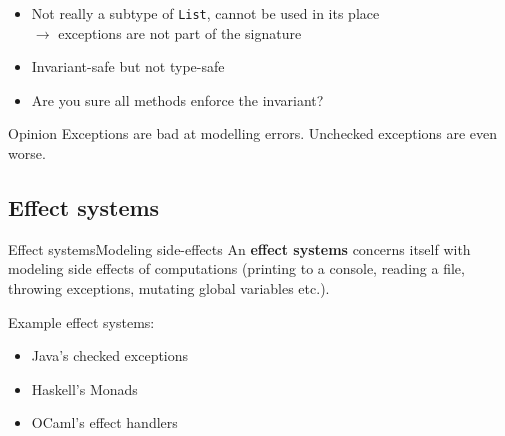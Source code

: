 \documentclass[compress,12pt,xcolor={dvipsnames}]{beamer}
\begin{document}
\begin{frame}
    \begin{itemize}
        \item Not really a subtype of \texttt{List}, cannot be used in its place
              \\$\to$ exceptions are not part of the signature
        \item Invariant-safe but not type-safe
        \item Are you sure all methods enforce the invariant?
    \end{itemize}
    \begin{alertblock}{Opinion}
        Exceptions are bad at modelling errors.  Unchecked exceptions are even worse. 
    \end{alertblock}
\end{frame}

\subsection{Effect systems}

\begin{frame}{Effect systems}{Modeling side-effects}
    An \textbf{effect systems} concerns itself with modeling side effects of computations (printing to a console, reading a file, throwing exceptions, mutating global variables etc.). 

    Example effect systems:

    \begin{itemize}
        \item Java's checked exceptions
        \item Haskell's Monads
        \item OCaml's effect handlers
    \end{itemize}
\end{frame}
\end{document}
